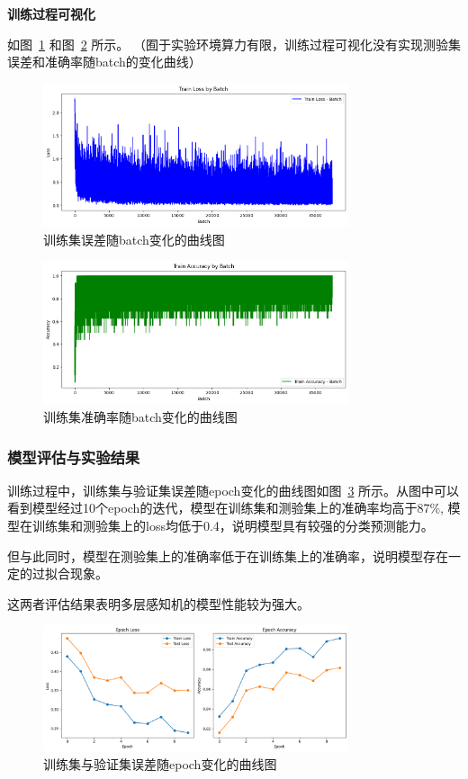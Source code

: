 \documentclass[12pt]{article}
\begin{document}
\textbf{训练过程可视化}

如图~\ref{2_1} 和图~\ref{2_2} 所示。
（囿于实验环境算力有限，训练过程可视化没有实现测验集误差和准确率随batch的变化曲线）
\begin{figure}[htbp]
  \centering
  \includegraphics[width=0.8\textwidth]{2_1.png}
  \caption[训练集误差随batch变化的曲线图]{训练集误差随batch变化的曲线图}
  \label{2_1}
\end{figure}

\begin{figure}[htbp]
  \centering
  \includegraphics[width=0.8\textwidth]{2_2.png}
  \caption[训练集准确率随batch变化的曲线图]{训练集准确率随batch变化的曲线图}
  \label{2_2}
\end{figure}



\subsubsection{模型评估与实验结果}
训练过程中，训练集与验证集误差随epoch变化的曲线图如图~\ref{2_3} 所示。从图中可以看到模型经过10个epoch的迭代，模型在训练集和测验集上的准确率均高于87\%,
模型在训练集和测验集上的loss均低于0.4，说明模型具有较强的分类预测能力。

但与此同时，模型在测验集上的准确率低于在训练集上的准确率，说明模型存在一定的过拟合现象。

这两者评估结果表明多层感知机的模型性能较为强大。

\begin{figure}[htbp]
  \centering
  \includegraphics[width=0.8\textwidth]{2_3.png}
  \caption[训练集与验证集误差随epoch变化的曲线图]{训练集与验证集误差随epoch变化的曲线图}
  \label{2_3}
\end{figure}
\end{document}
